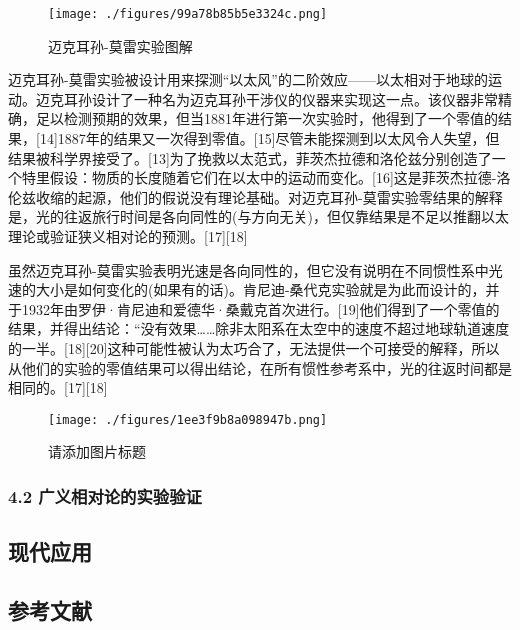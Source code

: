 \begin{figure}[ht]
\centering
\texttt{[image: ./figures/99a78b85b5e3324c.png]}
\caption{迈克耳孙-莫雷实验图解} \label{fig_XDL_2}
\end{figure}

迈克耳孙-莫雷实验被设计用来探测“以太风”的二阶效应——以太相对于地球的运动。迈克耳孙设计了一种名为迈克耳孙干涉仪的仪器来实现这一点。该仪器非常精确，足以检测预期的效果，但当1881年进行第一次实验时，他得到了一个零值的结果，[14]1887年的结果又一次得到零值。[15]尽管未能探测到以太风令人失望，但结果被科学界接受了。[13]为了挽救以太范式，菲茨杰拉德和洛伦兹分别创造了一个特里假设：物质的长度随着它们在以太中的运动而变化。[16]这是菲茨杰拉德-洛伦兹收缩的起源，他们的假说没有理论基础。对迈克耳孙-莫雷实验零结果的解释是，光的往返旅行时间是各向同性的(与方向无关)，但仅靠结果是不足以推翻以太理论或验证狭义相对论的预测。[17][18]

虽然迈克耳孙-莫雷实验表明光速是各向同性的，但它没有说明在不同惯性系中光速的大小是如何变化的(如果有的话)。肯尼迪-桑代克实验就是为此而设计的，并于1932年由罗伊·肯尼迪和爱德华·桑戴克首次进行。[19]他们得到了一个零值的结果，并得出结论：“没有效果……除非太阳系在太空中的速度不超过地球轨道速度的一半。[18][20]这种可能性被认为太巧合了，无法提供一个可接受的解释，所以从他们的实验的零值结果可以得出结论，在所有惯性参考系中，光的往返时间都是相同的。[17][18]

\begin{figure}[ht]
\centering
\texttt{[image: ./figures/1ee3f9b8a098947b.png]}
\caption{请添加图片标题} \label{fig_XDL_3}
\end{figure}

\subsubsection{4.2 广义相对论的实验验证}


\subsection{现代应用}


\subsection{参考文献}
